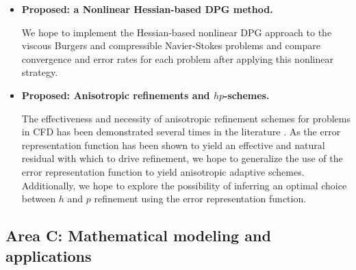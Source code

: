 \begin{itemize}
\item{\textbf{Proposed: a Nonlinear Hessian-based DPG method.}}

We hope to implement the Hessian-based nonlinear DPG approach to the viscous Burgers and compressible Navier-Stokes problems and compare convergence and error rates for each problem after applying this nonlinear strategy. 

\item{\textbf{Proposed: Anisotropic refinements and $hp$-schemes.}}

The effectiveness and necessity of anisotropic refinement schemes for problems in CFD has been demonstrated several times in the literature \cite{anisotropy1,anisotropy2}. As the error representation function has been shown to yield an effective and natural residual with which to drive refinement, we hope to generalize the use of the error representation function to yield anisotropic adaptive schemes. Additionally, we hope to explore the possibility of inferring an optimal choice between $h$ and $p$ refinement using the error representation function. %

\end{itemize}

\subsection{Area C: Mathematical modeling and applications}

